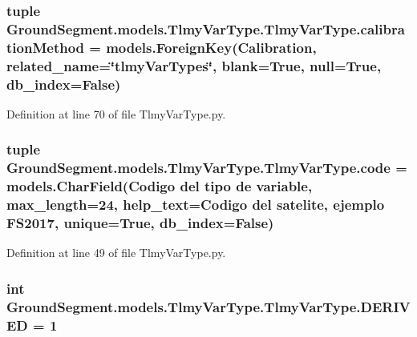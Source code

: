\subsubsection[{calibration\+Method}]{\setlength{\rightskip}{0pt plus 5cm}tuple Ground\+Segment.\+models.\+Tlmy\+Var\+Type.\+Tlmy\+Var\+Type.\+calibration\+Method = models.\+Foreign\+Key({\bf Calibration}, related\+\_\+name=\char`\"{}tlmy\+Var\+Types\char`\"{}, blank=True, null=True, db\+\_\+index=False)\hspace{0.3cm}{\ttfamily [static]}}\label{class_ground_segment_1_1models_1_1_tlmy_var_type_1_1_tlmy_var_type_aea6d325a3ab053c6ee06e71a6f06c7b6}


Definition at line 70 of file Tlmy\+Var\+Type.\+py.

\hypertarget{class_ground_segment_1_1models_1_1_tlmy_var_type_1_1_tlmy_var_type_ace8a3c643e6fbce147864aae31381c70}{}
\subsubsection[{code}]{\setlength{\rightskip}{0pt plus 5cm}tuple Ground\+Segment.\+models.\+Tlmy\+Var\+Type.\+Tlmy\+Var\+Type.\+code = models.\+Char\+Field(\textquotesingle{}Codigo del tipo de variable\textquotesingle{}, max\+\_\+length=24, help\+\_\+text=\textquotesingle{}Codigo del satelite, ejemplo F\+S2017\textquotesingle{}, unique=True, db\+\_\+index=False)\hspace{0.3cm}{\ttfamily [static]}}\label{class_ground_segment_1_1models_1_1_tlmy_var_type_1_1_tlmy_var_type_ace8a3c643e6fbce147864aae31381c70}


Definition at line 49 of file Tlmy\+Var\+Type.\+py.

\hypertarget{class_ground_segment_1_1models_1_1_tlmy_var_type_1_1_tlmy_var_type_a8b88adc2cddecf7dce5eedc89042a2cd}{}
\subsubsection[{D\+E\+R\+I\+V\+E\+D}]{\setlength{\rightskip}{0pt plus 5cm}int Ground\+Segment.\+models.\+Tlmy\+Var\+Type.\+Tlmy\+Var\+Type.\+D\+E\+R\+I\+V\+E\+D = 1\hspace{0.3cm}{\ttfamily [static]}}\label{class_ground_segment_1_1models_1_1_tlmy_var_type_1_1_tlmy_var_type_a8b88adc2cddecf7dce5eedc89042a2cd}


